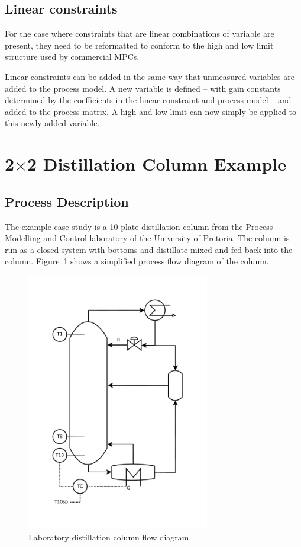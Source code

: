 \documentclass[final,authoryear,5pt,times,twocolumn]{elsarticle}
\begin{document}
\subsection{Linear constraints}\label{sec:lincons}
For the case where constraints that are linear combinations of variable are present, they need to be reformatted to conform to the high and low limit structure used by commercial MPCs.

Linear constraints can be added in the same way that unmeasured variables are added to the process model.
A new variable is defined -- with gain constants determined by the coefficients in the linear constraint and process model -- and added to the process matrix.
A high and low limit can now simply be applied to this newly added variable.


\section{2$\times$2 Distillation Column Example}\label{sec:dist}
\subsection{Process Description}
The example case study is a 10-plate distillation column from the Process Modelling and Control laboratory of the University of Pretoria.
The column is run as a closed system with bottoms and distillate mixed and fed back into the column.
Figure~\ref{fig:columnpfd} shows a simplified process flow diagram of the column.
\begin{figure}[htbp]
  \centering
    \includegraphics[width=8cm]{columnpfd.pdf}
  \caption[Laboratory distillation column photo and flow diagram]{Laboratory distillation column flow diagram.}
  \label{fig:columnpfd}
\end{figure}
\end{document}
